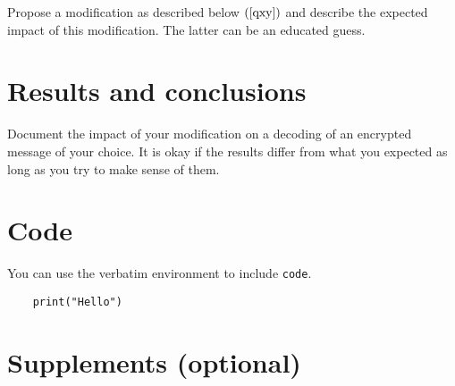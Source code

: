 \documentclass{article}
\newcommand{\req}[1]{(\ref{#1})}
\begin{document}
Propose a modification as described below $\req{qxy}$  and
describe the expected impact of this modification. The
latter can be an educated guess. 

\section{Results and conclusions}

Document the impact of your modification on
a decoding of an encrypted message of your choice.
It is okay if the results differ from what you expected
as long as you try to make sense of them.

\appendix

\section{Code}

You can use the verbatim environment to include \verb|code|.
{\small
\begin{verbatim}
    print("Hello")
\end{verbatim}
}

\section{Supplements (optional)}


 
\end{document}
